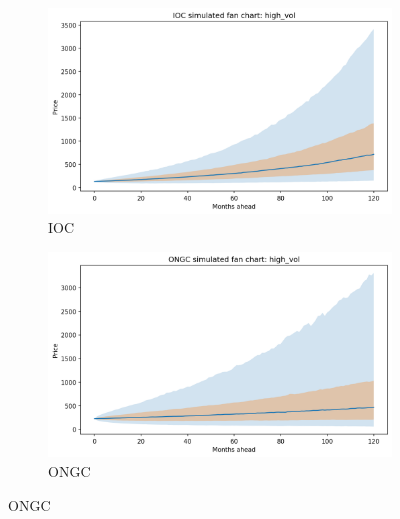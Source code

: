 \documentclass[11pt]{article}
\begin{document}
\begin{figure}[htbp]
\centering
\begin{subfigure}{0.48\textwidth}
    \includegraphics[width=\textwidth]{fan_IOC_high_vol.png}
    \caption{IOC}
\end{subfigure}
\hfill
\begin{subfigure}{0.48\textwidth}
    \includegraphics[width=\textwidth]{fan_ONGC_high_vol.png}
    \caption{ONGC}
\end{subfigure}

\vspace{0.5cm}


\end{figure}
\end{document}

